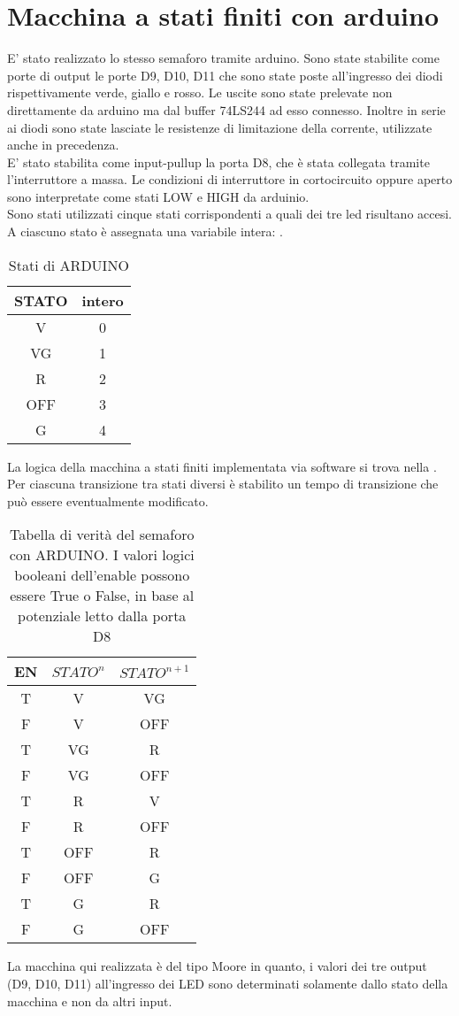 \section{Macchina a stati finiti con arduino}
E' stato realizzato lo stesso semaforo tramite arduino.
Sono state stabilite come porte di output le porte D9, D10, D11 che sono state poste all'ingresso dei diodi rispettivamente verde, giallo e rosso. Le uscite sono state prelevate non direttamente da arduino ma dal buffer 74LS244 ad esso connesso. Inoltre in serie ai diodi sono state lasciate le resistenze di limitazione della corrente, utilizzate anche in precedenza.\\
E' stato stabilita come input-pullup la porta D8, che è stata collegata tramite l'interruttore a massa. Le condizioni di interruttore in cortocircuito oppure aperto sono interpretate come stati LOW e HIGH da arduinio.\\ 
Sono stati utilizzati cinque stati corrispondenti a quali dei tre led risultano accesi. A ciascuno stato è assegnata una variabile intera: .
\begin{table}[h]
	\centering
	\begin{tabular}{cc}		
		 STATO& intero\\
		 \midrule 
		 V & 0\\
		VG & 1\\
		R &  2\\
		OFF & 3\\
		G & 4\\ 
		          
 	\end{tabular}
	\caption{ Stati di ARDUINO }
	\label{t:stati_arduino}
\end{table}
La logica della macchina a stati finiti implementata via software si trova nella . Per ciascuna transizione tra stati diversi è stabilito un tempo di transizione che può essere eventualmente modificato. 
\begin{table}[h]
	\centering
	\begin{tabular}{ccc}		
		 EN& $STATO^{n}$& $STATO^{n+1}$\\
		 \midrule 
		 T & V &  VG\\
		 F & V & OFF\\
		 T & VG & R\\
		 F & VG & OFF\\
		 T & R & V\\
		 F & R & OFF\\
		 T & OFF & R\\
		 F & OFF & G\\
		 T & G & R\\
		 F & G & OFF\\
		          
 	\end{tabular}
	\caption{ Tabella di verità del semaforo con ARDUINO. I valori logici booleani dell'enable possono essere True o False, in base al potenziale letto dalla porta D8 }
	\label{t:semaforo_arduino}
\end{table}

La macchina qui realizzata è del tipo Moore in quanto, i valori dei tre output (D9, D10, D11) all'ingresso dei LED sono determinati solamente dallo stato della macchina e non da altri input.\\

